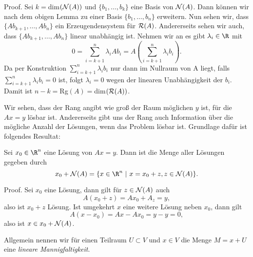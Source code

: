 \begin{emphBox}{}{}
Proof.  Sei \(k=\)dim\(({\cal N}(A))\) und \(\{b_1,\ldots,b_k\}\) eine Basis von \({\cal N}(A)\). Dann können wir nach dem obigen Lemma zu einer Basis \(\{b_1,\ldots,b_n\}\) erweitern. Nun sehen wir, dass \(\{Ab_{k+1},\ldots,Ab_n\}\) ein Erzeugendensystem für \({\cal R}(A)\). Andererseits sehen wir auch, dass \(\{Ab_{k+1},\ldots,Ab_n\}\) linear unabhängig ist. Nehmen wir an es gibt \(\lambda_i \in \R\) mit
\begin{equation*}
 0 = \sum_{i=k+1}^n \lambda_i A b_i = A(\sum_{i=k+1}^n \lambda_i b_i).
\end{equation*}
Da per Konstruktion \(\sum_{i=k+1}^n \lambda_i b_i\) nur dann im Nullraum von A liegt, falls \(\sum_{i=k+1}^n \lambda_i b_i = 0\) ist, folgt \(\lambda_i=0\)  wegen der linearen Unabhängigkeit der \(b_i\).
Damit ist \(n-k=\)Rg\((A)=\)dim\(({\cal R}(A))\).
\end{emphBox}

Wir sehen, dass der Rang angibt wie groß der Raum möglichen \(y\) ist, für die \(Ax = y\) lösbar ist. Andererseits gibt uns der Rang auch Information über die mögliche Anzahl der Lösungen, wenn das Problem lösbar ist. Grundlage dafür ist folgendes Resultat:
\label{vektorraeume/LGS:lemma-3}
\begin{lemma}{}{}



Sei \(x_0 \in \R^n\) eine Lösung von \(A x = y\). Dann ist die Menge aller Lösungen gegeben durch
\begin{equation*}
 x_0 + {\cal N}(A) = \{ x \in \R^n ~|~x=x_0+z, z \in {\cal N}(A)\}.
\end{equation*}\end{lemma}

\begin{emphBox}{}{}
Proof.  Sei \(x_0\) eine Lösung, dann gilt für \(z \in {\cal N}(A)\) auch
\begin{equation*}
 A(x_0+z) = Ax_0  + A_z =y,
\end{equation*}
also ist \(x_0 + z\) Lösung. Ist umgekehrt \(x\) eine weitere Lösung neben \(x_0\), dann gilt
\begin{equation*}
 A(x-x_0)  = Ax - Ax_0= y - y=0,
\end{equation*}
also ist \(x \in x_0 + {\cal N}(A)\).
\end{emphBox}

Allgemein nennen wir für einen Teilraum \(U \subset V\) und \(x \in V\) die Menge  \(M= x + U\) eine \emph{lineare Mannigfaltigkeit}.


